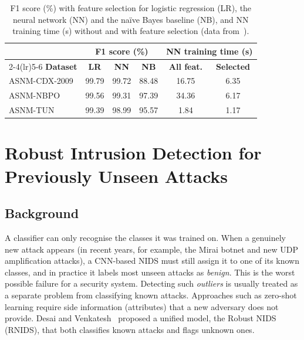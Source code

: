 \begin{table}[H]
\centering
\caption{F1 score (\%) with feature selection for logistic regression (LR), the neural network (NN) and the na\"ive Bayes baseline (NB), and NN training time (s) without and with feature selection (data from~\cite{ml_features2023}).}
\label{tab:ml_ids_results}
\small
\setlength{\tabcolsep}{4pt}
\begin{tabular}{@{}lccccc@{}}
\toprule
& \multicolumn{3}{c}{\textbf{F1 score (\%)}} & \multicolumn{2}{c}{\textbf{NN training time (s)}} \\
\cmidrule(lr){2-4}\cmidrule(lr){5-6}
\textbf{Dataset} & \textbf{LR} & \textbf{NN} & \textbf{NB} & \textbf{All feat.} & \textbf{Selected} \\
\midrule
ASNM-CDX-2009 & 99.79 & 99.72 & 88.48 & 16.75 & 6.35 \\
ASNM-NBPO     & 99.56 & 99.31 & 97.39 & 34.36 & 6.17 \\
ASNM-TUN      & 99.39 & 98.99 & 95.57 & 1.84  & 1.17 \\
\bottomrule
\end{tabular}
\end{table}

\section{Robust Intrusion Detection for Previously Unseen Attacks}
\label{sec:ml_rnids}

\subsection{Background}
A classifier can only recognise the classes it was trained on. When a genuinely new attack appears (in recent years, for example, the Mirai botnet and new UDP amplification attacks), a CNN-based NIDS must still assign it to one of its known classes, and in practice it labels most unseen attacks as \emph{benign}. This is the worst possible failure for a security system. Detecting such \emph{outliers} is usually treated as a separate problem from classifying known attacks. Approaches such as zero-shot learning require side information (attributes) that a new adversary does not provide. Desai and Venkatesh~\cite{ml_rnids2022} proposed a unified model, the Robust NIDS (RNIDS), that both classifies known attacks and flags unknown ones.

